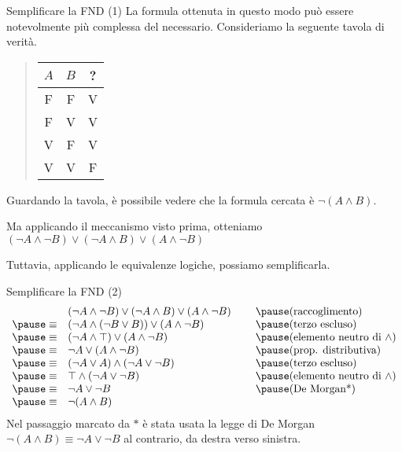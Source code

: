 \documentclass[aspectratio=169,10pt,dvipsnames,xcolor=table,handout]{beamer}
\begin{document}
\begin{frame}{Semplificare la FND (1)}
    La formula ottenuta in questo modo può essere notevolmente più complessa del necessario. Consideriamo la seguente tavola di verità.

    \medskip
    \begin{quote}
        \begin{tabular}{c|c||c}
            $A$ & $B$ & ? \\
            \hline
            F   & F  & V \\
            F   & V  & V \\
            V   & F  & V \\
            V   & V  & F \\
        \end{tabular}
    \end{quote}

    \pause
    \medskip Guardando la tavola, è possibile vedere che la formula cercata è \pause $\neg (A \wedge B)$.

    \pause
    \medskip Ma applicando il meccanismo visto prima, otteniamo $(\neg A \wedge \neg B) \vee (\neg A \wedge B) \vee (A \wedge \neg B)$

    \pause
    \medskip Tuttavia, applicando le equivalenze logiche, possiamo semplificarla.
\end{frame}

\begin{frame}{Semplificare la FND (2)}
    \[
        \begin{array}{rl@{\hspace{0.8cm}}l}
                          & (\neg A \wedge \neg B) \vee (\neg A \wedge B) \vee (A \wedge \neg B) & \pause \text{(raccoglimento)} \\
            \pause \equiv & \left(\neg A \wedge (\neg B \vee B)\right) \vee (A \wedge \neg B)           & \pause \text{(terzo escluso)}            \\
            \pause \equiv & \left(\neg A \wedge \top\right) \vee (A \wedge \neg B)           & \pause \text{(elemento neutro di $\wedge$)}            \\
            \pause \equiv & \neg A \vee (A \wedge \neg B)                     & \pause \text{(prop. distributiva)}          \\
            \pause \equiv & (\neg A \vee A) \wedge (\neg A \vee \neg B)        & \pause \text{(terzo escluso)}      \\
            \pause \equiv & \top \wedge (\neg A \vee \neg B)        & \pause \text{(elemento neutro di $\wedge$)}      \\
            \pause \equiv & \neg A \vee \neg B       & \pause \text{(De Morgan*)}      \\
            \pause \equiv & \neg (A \wedge B)
        \end{array}
    \]
    Nel passaggio marcato da $*$ è stata usata la legge di De Morgan $\neg (A \wedge B) \equiv \neg A \vee \neg B$ al contrario, da destra verso sinistra.
\end{frame}
\end{document}
